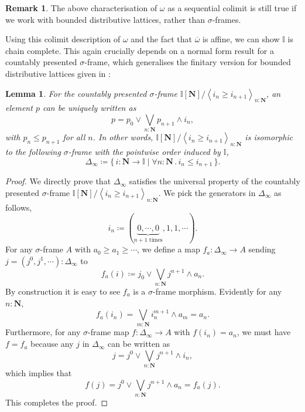 \documentclass[a4paper,12pt]{amsart}
\newtheorem{lemma}[theorem]{Lemma}
\theoremstyle{definition}
\newtheorem{remark}[theorem]{Remark}
\newcommand{\mb}[1]{\mathbf{#1}}
\newcommand{\mbb}[1]{\mathbb{#1}}
\newcommand{\I}{\mbb I}
\newcommand{\ov}[1]{\overline{#1}}
\newcommand{\pair}[1]{\left\langle#1\right\rangle}
\newcommand{\scomp}[2]{\{\,#1\mid#2\,\}}
\newcommand{\N}{\mb N}
\newcommand{\fa}[2]{\forall #1\!\colon\!\!#2\mathpunct{.}}
\begin{document}
\begin{remark}\label{rem:omegaalwayscolim}
  The above characterisation of $\omega$ as a sequential colimit is still true if we work with bounded distributive lattices, rather than $\sigma$-frames.
\end{remark}

Using this colimit description of $\omega$ and the fact that $\ov\omega$ is affine, we can show $\I$ is chain complete. This again crucially depends on a normal form result for a countably presented $\sigma$-frame, which generalises the finitary version for bounded distributive lattices given in :

\begin{lemma}\label{app:normalsigma}
  For the countably presented $\sigma$-frame $\I[\N]/\pair{i_n \ge i_{n+1}}_{n:\N}$, an element $p$ can be uniquely written as 
  \[ p = p_0 \vee \bigvee_{n:\N} p_{n+1} \wedge i_n, \]
  with $p_n \le p_{n+1}$ for all $n$. In other words, $\I[\N]/\pair{i_n \ge i_{n+1}}_{n:\N}$ is isomorphic to the following $\sigma$-frame with the pointwise order induced by $\I$,
  \[ \Delta_\infty \coloneq \scomp{i : \N \to \I}{\fa n\N i_n \le i_{n+1}}. \]
\end{lemma}
\begin{proof}
  We directly prove that $\Delta_\infty$ satisfies the universal property of the countably presented $\sigma$-frame $\I[\N]/\pair{i_n \ge i_{n+1}}_{n:\N}$. We pick the generators in $\Delta_\infty$ as follows,
  \[ i_n \coloneq (\underbrace{0,\cdots,0}_{n+1 \text{ times}},1,1,\cdots). \]
  For any $\sigma$-frame $A$ with $a_0 \ge a_1 \ge \cdots$, we define a map $f_a : \Delta_\infty \to A$ sending $j = (j^0,j^1,\cdots) : \Delta_\infty$ to
  \[ f_a(i) \coloneq j_0 \vee \bigvee_{n:\N} j^{n+1} \wedge a_{n}. \]
  By construction it is easy to see $f_a$ is a $\sigma$-frame morphism. Evidently for any $n : \N$, 
  \[ f_a(i_n) = \bigvee_{m:\N} i_n^{m+1} \wedge a_m = a_n. \]
  Furthermore, for any $\sigma$-frame map $f \colon \Delta_\infty \to A$ with $f(i_n) = a_n$, we must have $f = f_a$ because any $j$ in $\Delta_\infty$ can be written as
  \[ j = j^0 \vee \bigvee_{n:\N} j^{n+1} \wedge i_n, \]
  which implies that
  \[ f(j) = j^0 \vee \bigvee_{n:\N}j^{n+1} \wedge a_n = f_a(j). \]
  This completes the proof.
\end{proof}

\end{document}
